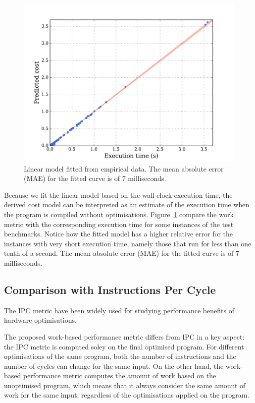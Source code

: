 \begin{figure}[htb]
    \centering
    \includegraphics[width=0.9\linewidth]{figs/cost-model.pdf}
    \caption{Linear model fitted from empirical data. The mean absolute error (MAE) for the fitted curve is of 7 milliseconds.}
    \label{fig:cost-model}
\end{figure}

Because we fit the linear model based on the wall-clock execution time, the derived cost model can be interpreted as an estimate of the execution time when the program is compiled without optimisations.
Figure~\ref{fig:cost-model} compare the work metric with the corresponding execution time for some instances of the test benchmarks.
Notice how the fitted model has a higher relative error for the instances with very short execution time, namely those that run for less than one tenth of a second.
The mean absolute error (MAE) for the fitted curve is of 7 milliseconds.

\subsection{Comparison with Instructions Per Cycle} \label{sec:ipc-vs-work-metric}

The IPC metric have been widely used for studying performance benefits of hardware optimisations.

The proposed work-based performance metric differs from IPC in a key aspect:
the IPC metric is computed soley on the final optimised program.
For different optimisations of the same program, both the number of instructions and the number of cycles can change for the same input.
On the other hand, the work-based performance metric computes the amount of work based on the unoptimised program, which means that it always consider the same amount of work for the same input, regardless of the optimisations applied on the program.

